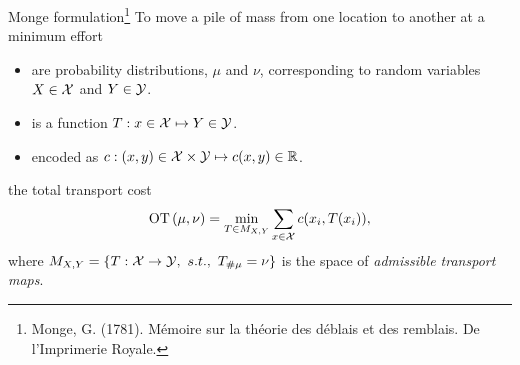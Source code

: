 \documentclass[pdf,aspectratio=169,10pt]{beamer}
\begin{document}
\begin{frame}[plain]{Monge formulation\footnote{Monge, G. (1781).
Mémoire sur la théorie des déblais et des remblais.
De l'Imprimerie Royale.}}
 To move a pile of mass from one location to another at a minimum effort\\
\vspace{1em}

\begin{minipage}[t]{0.69\textwidth}
   \begin{itemize}
       \item {} are probability distributions, $\mu$ and $\nu$, corresponding to random variables $X\in{\mathcal{X}}$ and $Y\in{\mathcal{Y}}$. 
       \item {} is a function $T: x \in {\mathcal{X}}\mapsto Y\in{\mathcal{Y}}$.
    \item {} encoded as $c: (x,y)\in{\mathcal{X}}\times{\mathcal{Y}}\mapsto c(x,y)\in{\mathbb{R}}$.
   \end{itemize}
\vspace{1em}

  the total transport cost
    \begin{equation}
        \operatorname{OT}{(\mu,\nu)} = \min_{T\in M_{X,Y}}\sum_{x\in{\mathcal{X}}} c(x_i, T(x_i)),
    \end{equation}
     where $M_{X,Y} = \{ T: {\mathcal{X}} \to {\mathcal{Y}},\ s.t.,\ T_{\#\mu}=\nu \}$ is the space of \emph{admissible transport maps}.
\end{minipage}   
\hfill
\begin{minipage}[t]{0.3\textwidth}
\vspace{2em}
\end{minipage}   

\end{frame}
\end{document}
